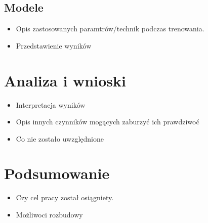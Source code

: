 \section{Modele }
\label{cha:pierwszyDokument}

\begin{itemize}
\item Opis zastosowanych paramtrów/technik podczas trenowania.
\item Przedstawienie wyników 
\end{itemize}


\chapter{Analiza i wnioski }
\label{cha:pierwszyDokument}

\begin{itemize}
\item Interpretacja wyników
\item Opis innych czynników mogących zaburzyć ich prawdziwoć
\item Co nie zostało uwzględnione 
\end{itemize}


\chapter{Podsumowanie}
\label{cha:pierwszyDokument}

\begin{itemize}
\item Czy cel pracy został osiągniety.
\item Możliwoci rozbudowy
\end{itemize}





